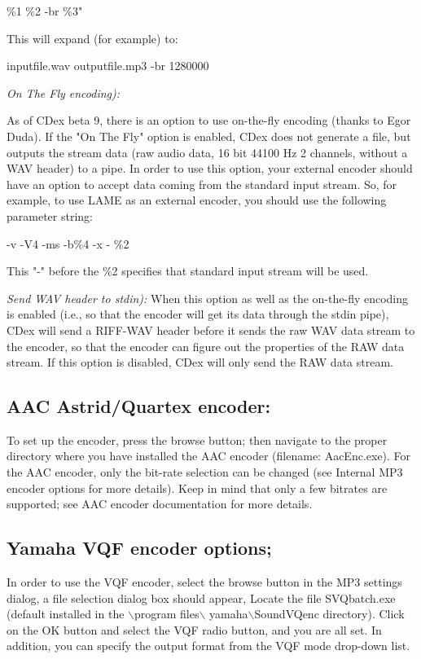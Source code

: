 \%1 \%2 -br \%3"

This will expand (for example) to:

inputfile.wav outputfile.mp3 -br 1280000


{\it On The Fly encoding):}

As of CDex beta 9, there is an option to use on-the-fly encoding (thanks to Egor Duda). If the "On The Fly"
option is enabled, CDex does not generate a file, but outputs the stream data (raw audio data, 16 bit 44100 Hz 
2 channels, without a WAV header) to a pipe. 
In order to use this option, your external encoder should have an option to accept data coming from 
the standard input stream. So, for example, to use LAME as an external encoder, you should use the following 
parameter string:

-v -V4 -ms -b\%4 -x - \%2

This "-" before the \%2 specifies that standard input stream will be used.

{\it Send WAV header to stdin):}
When this option as well as the on-the-fly encoding is enabled (i.e., so that the encoder 
will get its data through the stdin pipe), CDex will send a RIFF-WAV header before it 
sends the raw WAV data stream to the encoder, so that the encoder can figure out the 
properties of the RAW data stream. If this option is disabled, CDex will only 
send the RAW data stream.

\subsection{AAC Astrid/Quartex encoder:}

To set up the encoder, press the browse button; then navigate to the
proper directory where you have installed the AAC encoder (filename:
AacEnc.exe). For the AAC encoder, only the bit-rate selection can be changed (see
Internal MP3 encoder options for more details). Keep in mind that only a
few bitrates are supported; see AAC encoder documentation for more details.


\subsection{Yamaha VQF encoder options;}

In order to use the VQF encoder, select the browse button in the MP3 settings
dialog, a file selection dialog box should appear, Locate the file
SVQbatch.exe (default installed in the $\backslash$program files$\backslash$
yamaha$\backslash$SoundVQenc directory). Click on the OK button and select
the VQF radio button, and you are all set. In addition, you can specify the
output format from the VQF mode drop-down list.


